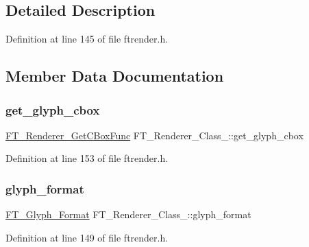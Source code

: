 \subsection{Detailed Description}


Definition at line 145 of file ftrender.\+h.



\subsection{Member Data Documentation}
\mbox{\label{struct_f_t___renderer___class___a4f9dc9b6d86504a8d3b04b4e72936e76}} 
\subsubsection{\texorpdfstring{get\_glyph\_cbox}{get\_glyph\_cbox}}
{\footnotesize\ttfamily \mbox{\hyperlink{ftrender_8h_adba414b141b3605331209b8961c3ae2a}{F\+T\+\_\+\+Renderer\+\_\+\+Get\+C\+Box\+Func}} F\+T\+\_\+\+Renderer\+\_\+\+Class\+\_\+\+::get\+\_\+glyph\+\_\+cbox}



Definition at line 153 of file ftrender.\+h.

\mbox{\label{struct_f_t___renderer___class___a2c8602452fae27379a6f85bbcb4b525c}} 
\subsubsection{\texorpdfstring{glyph\_format}{glyph\_format}}
{\footnotesize\ttfamily \mbox{\hyperlink{ftimage_8h_aeca0d10a27aedecbf96515e0628aff1f}{F\+T\+\_\+\+Glyph\+\_\+\+Format}} F\+T\+\_\+\+Renderer\+\_\+\+Class\+\_\+\+::glyph\+\_\+format}



Definition at line 149 of file ftrender.\+h.

\mbox{\label{struct_f_t___renderer___class___a5af75b9f582f98f9f74dbcbc530c7e88}} 
